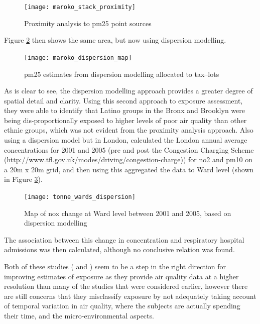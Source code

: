 \begin{figure}[H]
\centering
\texttt{[image: maroko\_stack\_proximity]}
\caption{Proximity analysis to \gls{pm25} point sources}
\label{fig:maroko_stack_proximity}
\end{figure}

Figure \ref{fig:maroko_dispersion_map} then shows the same area, but now using dispersion modelling.

\begin{figure}[H]
\centering
\texttt{[image: maroko\_dispersion\_map]}
\caption{\gls{pm25} estimates from dispersion modelling allocated to tax--lots}
\label{fig:maroko_dispersion_map}
\end{figure}

As is clear to see, the dispersion modelling approach provides a greater degree of spatial detail and clarity. Using this second approach to exposure assessment, they were able to identify that Latino groups in the Bronx and Brooklyn were being dis-proportionally exposed to higher levels of poor air quality than other ethnic groups, which was not evident from the proximity analysis approach. Also using a dispersion model but in London, \cite{Tonne2010} calculated the London annual average concentrations for 2001 and 2005 (pre and post the Congestion Charging Scheme (\url{http://www.tfl.gov.uk/modes/driving/congestion-charge})) for \gls{no2} and \gls{pm10} on a 20m x 20m grid, and then using this aggregated the data to Ward level (shown in Figure \ref{fig:tonne_wards_dispersion}).

\begin{figure}[H]
\centering
\texttt{[image: tonne\_wards\_dispersion]}
\caption{Map of \gls{nox} change at Ward level between 2001 and 2005, based on dispersion modelling}
\label{fig:tonne_wards_dispersion}
\end{figure}

The association between this change in concentration and respiratory hospital admissions was then calculated, although no conclusive relation was found.

Both of these studies (\cite{Maroko2012} and \cite{Tonne2010}) seem to be a step in the right direction for improving estimates of exposure as they provide air quality data at a higher resolution than many of the studies that were considered earlier, however there are still concerns that they misclassify exposure by not adequately taking account of temporal variation in air quality, where the subjects are actually spending their time, and the micro-environmental aspects.

